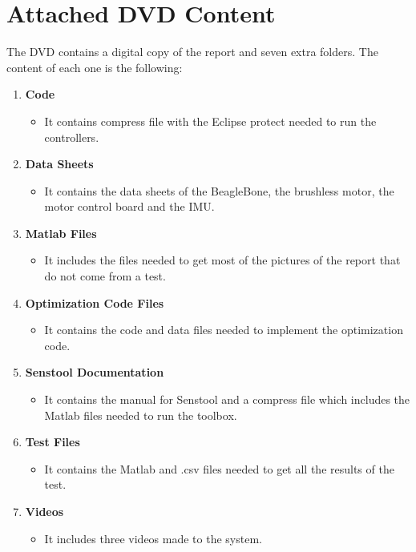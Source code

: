 \chapter{Attached DVD Content}

The DVD contains a digital copy of the report and seven extra folders. The content of each one is the following:
\begin{enumerate}
	\item \textbf{Code}
	\begin{itemize}
		\item[] It contains compress file with the Eclipse protect needed to run the controllers.
	\end{itemize}
	
	\item \textbf{Data Sheets}  
	\begin{itemize}
		\item[] It contains the data sheets of the BeagleBone, the brushless motor, the motor control board and the IMU.
	\end{itemize}
	
	\item \textbf{Matlab Files}  
	\begin{itemize}
		\item[] It includes the files needed to get most of the pictures of the report that do not come from a test.
	\end{itemize}
	
	\item \textbf{Optimization Code Files}  
	\begin{itemize}
		\item[] It contains the code and data files needed to implement the optimization code.
	\end{itemize}
	
	\item \textbf{Senstool Documentation}  
	\begin{itemize}
		\item[] It contains the manual for Senstool and a compress file which includes the Matlab files needed to run the toolbox.
	\end{itemize}	
	
	\item \textbf{Test Files}  
	\begin{itemize}
		\item[] It contains the Matlab and .csv files needed to get all the results of the test.
	\end{itemize}

	\item \textbf{Videos}  
	\begin{itemize}
		\item[] It includes three videos made to the system. 
	\end{itemize}
\end{enumerate}
